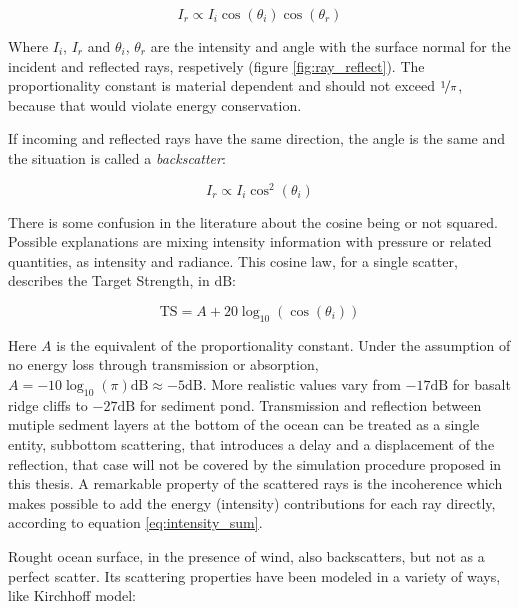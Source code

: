 \begin{equation}
\label{eq:lambert}
I_r \propto	 I_i \cos(\theta_i) \cos(\theta_r)
\end{equation}

Where $I_i$,  $I_r$ and $\theta_i$, $\theta_r$ are the intensity and angle with
the surface normal for the incident and reflected rays,
respetively (figure \ref{fig:ray_reflect}). The proportionality constant is
material dependent and should not exceed $\nicefrac{1}{\pi}$, because that would violate
energy conservation.

If incoming and reflected rays have the same direction, the angle is the same
and the situation is called a \textit{backscatter}:

\begin{equation*}
I_r \propto I_i \cos^2(\theta_i)
\end{equation*}

There is some confusion in the literature about the cosine being or not
squared\cite{durany2015analytical,cox2006tutorial,cox2004acoustic,jones2009modelling,LURTON,Etter2013}.
Possible explanations are mixing intensity information with pressure
or related quantities, as intensity and radiance. This cosine law, for a single
scatter, describes the Target Strength, in $\text{dB}$:

\begin{equation*}
\text{TS} = A + 20\log_{10}(\cos(\theta_i))
\end{equation*}

Here $A$ is the equivalent of the proportionality constant. Under the assumption
of no energy loss through transmission or absorption,
$A=-10\log_{10}(\pi)\text{dB} \approx -5\text{dB}$. More realistic values vary
from $-17\text{dB}$ for basalt ridge cliffs to $-27\text{dB}$ for sediment
pond\cite{dunn2015springer}.
Transmission and reflection between mutiple sedment layers at the bottom of the
ocean can be treated as a single entity, subbottom scattering, that introduces a
delay and a displacement of the reflection\cite{Etter2013}, that case will not
be covered by the simulation procedure proposed in this thesis. A remarkable
property of the scattered rays is the incoherence which makes possible to add
the energy (intensity) contributions for each ray directly, according to
equation \ref{eq:intensity_sum}.

Rought ocean surface, in the presence of wind, also backscatters, but not as a
perfect scatter. Its scattering properties have been modeled in a variety of
ways\cite{jones2009modelling}, like Kirchhoff model\cite{dunn2015springer}:

